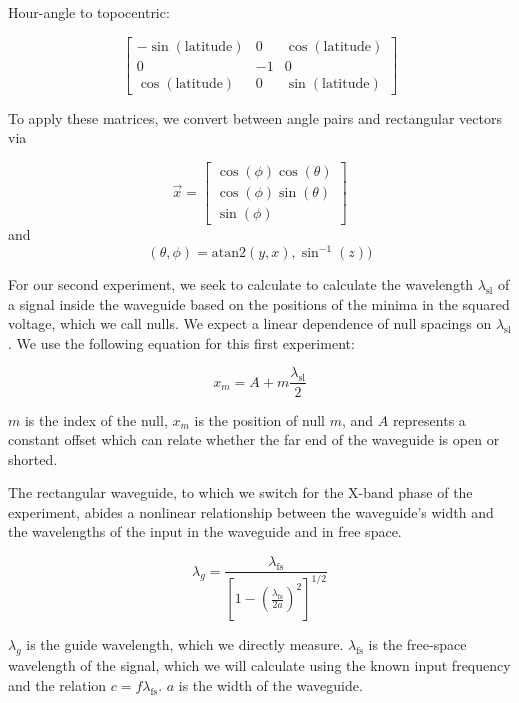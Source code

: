 \documentclass[12pt]{article}
\begin{document}
Hour-angle to topocentric:

\begin{equation}
\begin{bmatrix}
-\sin(\text{latitude}) & 0 & \cos(\text{latitude}) \\
0 & -1 & 0 \\
\cos(\text{latitude}) & 0 & \sin(\text{latitude})
\end{bmatrix}
\end{equation}

To apply these matrices, we convert between angle pairs and rectangular vectors via

\begin{equation}
\vec{x} = 
\begin{bmatrix}
\cos(\phi) \cos(\theta) \\
\cos(\phi) \sin(\theta) \\
\sin(\phi)
\end{bmatrix}
\end{equation}
and
\begin{equation}
(\theta, \phi) = \text{atan2}(y, x), \sin^{-1}(z))
\end{equation}

For our second experiment, we seek to calculate to calculate the wavelength $\lambda_\text{sl}$ of a signal inside the waveguide based on the positions of the minima in the squared voltage, which we call nulls. We expect a linear dependence of null spacings on $\lambda_\text{sl}$. We use the following equation for this first experiment:

\begin{equation}
x_m = A + m \frac{\lambda_\text{sl}}{2}
\end{equation}

$m$ is the index of the null, $x_m$ is the position of null $m$, and $A$ represents a constant offset which can relate whether the far end of the waveguide is open or shorted.

The rectangular waveguide, to which we switch for the X-band phase of the experiment, abides a nonlinear relationship between the waveguide's width and the wavelengths of the input in the waveguide and in free space.

\begin{equation} \label{eq:xband}
\lambda_g = \frac{\lambda_\text{fs}}{[1 - (\frac{\lambda_\text{fs}}{2a})^2]^{1/2}}
\end{equation}

$\lambda_g$ is the guide wavelength, which we directly measure. $\lambda_\text{fs}$ is the free-space wavelength of the signal, which we will calculate using the known input frequency and the relation $c = f \lambda_\text{fs}$. $a$ is the width of the waveguide.
\end{document}
